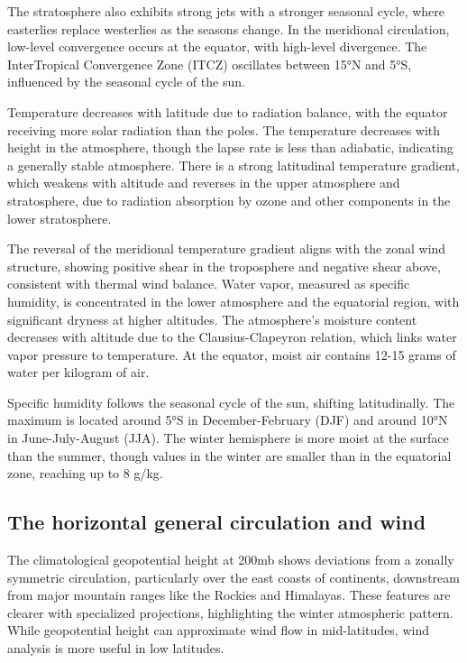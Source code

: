 The stratosphere also exhibits strong jets with a stronger seasonal cycle, where easterlies replace westerlies as the seasons change. In the meridional circulation, low-level convergence occurs at the equator, with high-level divergence. The InterTropical Convergence Zone (ITCZ) oscillates between 15°N and 5°S, influenced by the seasonal cycle of the sun.

Temperature decreases with latitude due to radiation balance, with the equator receiving more solar radiation than the poles. The temperature decreases with height in the atmosphere, though the lapse rate is less than adiabatic, indicating a generally stable atmosphere. There is a strong latitudinal temperature gradient, which weakens with altitude and reverses in the upper atmosphere and stratosphere, due to radiation absorption by ozone and other components in the lower stratosphere.

The reversal of the meridional temperature gradient aligns with the zonal wind structure, showing positive shear in the troposphere and negative shear above, consistent with thermal wind balance. Water vapor, measured as specific humidity, is concentrated in the lower atmosphere and the equatorial region, with significant dryness at higher altitudes. The atmosphere's moisture content decreases with altitude due to the Clausius-Clapeyron relation, which links water vapor pressure to temperature. At the equator, moist air contains 12-15 grams of water per kilogram of air.

Specific humidity follows the seasonal cycle of the sun, shifting latitudinally. The maximum is located around 5°S in December-February (DJF) and around 10°N in June-July-August (JJA). The winter hemisphere is more moist at the surface than the summer, though values in the winter are smaller than in the equatorial zone, reaching up to 8 g/kg.

\subsection{The horizontal general circulation and wind }

 The climatological geopotential height at 200mb shows deviations from a zonally symmetric circulation, particularly over the east coasts of continents, downstream from major mountain ranges like the Rockies and Himalayas. These features are clearer with specialized projections, highlighting the winter atmospheric pattern. While geopotential height can approximate wind flow in mid-latitudes, wind analysis is more useful in low latitudes.

